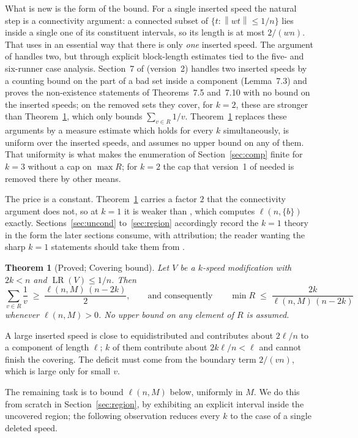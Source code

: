 \documentclass[11pt]{amsart}
\theoremstyle{plain}
\newtheorem{theorem}{Theorem}[section]
\theoremstyle{definition}
\newcommand{\LR}{\operatorname{LR}}
\newcommand{\nrm}[1]{\left\lVert #1 \right\rVert}
\begin{document}
What is new is the form of the bound. For a single inserted speed the natural step is a
connectivity argument: a connected subset of $\{t:\nrm{wt}\le 1/n\}$ lies inside a single one of its
constituent intervals, so its length is at most $2/(wn)$. That uses in an essential way that there
is only \emph{one} inserted speed. The argument of \cite{bhk} handles two, but through explicit
block-length estimates tied to the five- and six-runner case analysis. Section~7 of \cite{zhang}
(version~2) handles two inserted speeds by a counting bound on the part of a bad set inside a
component (Lemma~7.3) and proves the non-existence statements of Theorems~7.5 and~7.10 with no bound
on the inserted speeds; on the removed sets they cover, for $k=2$, these are stronger than
Theorem~\ref{thm:cover}, which only bounds $\sum_{v\in R}1/v$. Theorem~\ref{thm:cover} replaces
these arguments by a measure estimate which holds for every $k$ simultaneously, is uniform over the
inserted speeds, and assumes no upper bound on any of them. That uniformity is what makes the
enumeration of Section~\ref{sec:comp} finite for $k=3$ without a cap on $\max R$; for $k=2$ the
cap that version~1 of \cite{zhang} needed is removed there by other means.

The price is a constant. Theorem~\ref{thm:cover} carries a factor $2$ that the connectivity argument
does not, so at $k=1$ it is weaker than \cite[Thm.~1.4]{zhang}, which computes $\ell(n,\{b\})$
exactly. Sections~\ref{sec:uncond} to~\ref{sec:region} accordingly record the $k=1$ theory in the
form the later sections consume, with attribution; the reader wanting the sharp $k=1$ statements
should take them from \cite{zhang}.

\begin{theorem}[Proved; Covering bound]\label{thm:cover}
Let $V$ be a $k$-speed modification with $2k<n$ and $\LR(V)\le 1/n$. Then
\[
  \sum_{v\in R}\frac1v\;\ge\;\frac{\ell(n,M)\,(n-2k)}{2},
  \qquad\text{and consequently}\qquad
  \min R\;\le\;\frac{2k}{\ell(n,M)\,(n-2k)}
\]
whenever $\ell(n,M)>0$. No upper bound on any element of $R$ is assumed.
\end{theorem}

A large inserted speed is close to equidistributed and contributes about $2\ell/n$ to a component of
length $\ell$; $k$ of them contribute about $2k\ell/n<\ell$ and cannot finish the covering. The
deficit must come from the boundary term $2/(vn)$, which is large only for small $v$.

The remaining task is to bound $\ell(n,M)$ below, uniformly in $M$. We do this from scratch in
Section~\ref{sec:region}, by exhibiting an explicit interval inside the uncovered region; the following
observation reduces every $k$ to the case of a single deleted speed.
\end{document}
